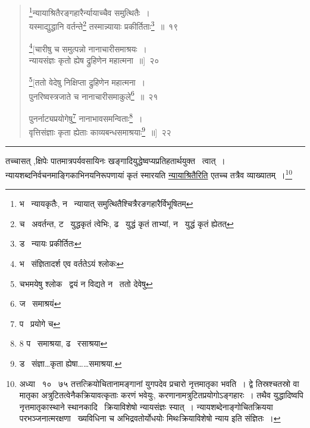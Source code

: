 \documentclass[11pt, openany]{book}
\begin{document}
\newpage

\begin{quote}
{\na \renewcommand{\thefootnote}{1}\footnote{भ \textendash\ न्यायकृतैः, न \textendash\ न्यायात् समुत्थितैश्चित्रैरङगहारैर्विभूषितम्}न्यायाश्रितैरङ्गहारैर्न्यायाच्चैव समुत्थितैः~।\\
यस्माद्युद्धानि वर्तन्ते\renewcommand{\thefootnote}{2}\footnote{च \textendash\ अवर्तन्त, ट \textendash\ युद्धकृतं त्वेभिः, ढ \textendash\ युद्धं कृतं ताभ्यां, न \textendash\ युद्धं कृतं ह्येतत्} तस्मान्न्यायाः प्रकीर्तिताः\renewcommand{\thefootnote}{3}\footnote{ड \textendash\ न्यायः प्रकीर्तितः}~॥~१९

\renewcommand{\thefootnote}{4}\footnote{भ \textendash\ संज्ञितादर्श एव वर्ततेऽयं श्लोकः}[चारीषु च समुत्पन्नो नानाचारीसमाश्रयः~।\\
न्यायसंज्ञः कृतो ह्येष द्रुहिणेन महात्मना~॥]~२०

\renewcommand{\thefootnote}{5}\footnote{चभमयेषु श्लोक \textendash\ द्वयं न विद्यते न \textendash\ ततो देवेषु}[ततो वेदेषु निक्षिप्ता द्रुहिणेन महात्मना~।\\
पुनरिष्वस्त्रजाते च नानाचारीसमाकुले\renewcommand{\thefootnote}{6}\footnote{ज \textendash\ समाश्रयं}~॥~२१

पुनर्नाट्यप्रयोगेषु\renewcommand{\thefootnote}{7}\footnote{प \textendash\ प्रयोगे च} नानाभावसमन्विताः\renewcommand{\thefootnote}{8}\footnote{8 प \textendash\ समाश्रया, ढ \textendash\ रसाश्रया}~।\\
वृत्तिसंज्ञाः कृता ह्येताः काव्यबन्धसमाश्रयाः\renewcommand{\thefootnote}{9}\footnote{ड \textendash\ संज्ञा\ldots कृता ह्येषा\ldots \ldots समाश्रया.}~॥]~२२}
\end{quote}

\hrule

\vspace{2mm}
\noindent
तच्चासत् ,क्षिपेः पातमात्रपर्यवसायिनः खङ्गादियुद्धेष्वप्यप्रतिहतार्थयुक्त \textendash\ त्वात्~। न्यायशब्दनिर्वचनमाङ्गिकाभिनयनिरूपणायां कृतं स्मारयति \underline{न्यायाश्रितैरिति} एतच्च तत्रैव व्याख्यातम्~।\renewcommand{\thefootnote}{*}\footnote{अध्या \textendash\ १० \textendash\ ७५ तत्तत्क्रियोचितानामङ्गानां युगपदेव प्रचारो नृत्तमातृका भवति~। द्वे तिस्रश्चतस्रो वा मातृका अत्रुटितत्वेनैकक्रियावत्कृताः करणं भवेयुः, करणानामत्रुटितप्रयोगोऽङ्गहारः~। तथैव युद्धादिष्वपि नृत्तमातृकास्थाने स्थानकादि \textendash\ क्रियाविशेषो न्यायसंज्ञः स्यात्~। न्यायशब्देनाङ्गोचितक्रियया परभञ्जनात्मरक्षणा \textendash\ ख्यविधिना च अभिद्रवतोर्योधयोः मिथःक्रियाविशेषो न्याय इति संज्ञितः~।}\\
\end{document}
